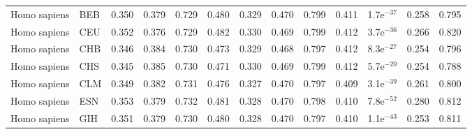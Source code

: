 \begin{longtable}{llrrrrrrrrrrr}
        Homo sapiens &                       BEB &                              0.350 &                               0.379 &                 0.729 &                 0.480 &                              0.329 &                               0.470 &                 0.799 &                 0.411 &  1.7e$^{-37}$ &  0.258 &  0.795 \\
        Homo sapiens &                       CEU &                              0.352 &                               0.376 &                 0.729 &                 0.482 &                              0.330 &                               0.469 &                 0.799 &                 0.412 &  3.7e$^{-36}$ &  0.266 &  0.820 \\
        Homo sapiens &                       CHB &                              0.346 &                               0.384 &                 0.730 &                 0.473 &                              0.329 &                               0.468 &                 0.797 &                 0.412 &  8.3e$^{-27}$ &  0.254 &  0.796 \\
        Homo sapiens &                       CHS &                              0.345 &                               0.385 &                 0.730 &                 0.471 &                              0.330 &                               0.469 &                 0.799 &                 0.412 &  5.7e$^{-20}$ &  0.254 &  0.788 \\
        Homo sapiens &                       CLM &                              0.349 &                               0.382 &                 0.731 &                 0.476 &                              0.327 &                               0.470 &                 0.797 &                 0.409 &  3.1e$^{-39}$ &  0.261 &  0.800 \\
        Homo sapiens &                       ESN &                              0.353 &                               0.379 &                 0.732 &                 0.481 &                              0.328 &                               0.470 &                 0.798 &                 0.410 &  7.8e$^{-52}$ &  0.280 &  0.812 \\
        Homo sapiens &                       GIH &                              0.351 &                               0.379 &                 0.730 &                 0.480 &                              0.328 &                               0.470 &                 0.797 &                 0.410 &  1.1e$^{-43}$ &  0.253 &  0.811 \\

\end{longtable}

